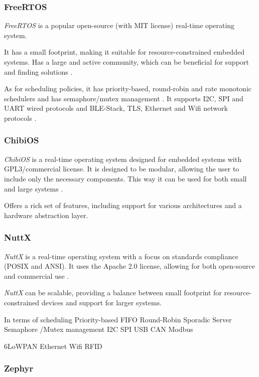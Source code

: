 \subsubsection{FreeRTOS}
\textit{FreeRTOS} is a popular open-source (with MIT license) real-time operating system.

It has a small footprint, making it suitable for resource-constrained embedded systems.
Has a large and active community, which can be beneficial for support and finding solutions \cite{RTOS6}.

As for scheduling policies, it has priority-based, round-robin and rate monotonic schedulers and has semaphore/mutex management \cite{compRTOS}.
It supports I2C, SPI and UART wired protocols and BLE-Stack, TLS, Ethernet and  Wifi network protocols \cite{compRTOS}.
\subsubsection{ChibiOS}

\textit{ChibiOS} is a real-time operating system designed for embedded systems with GPL3/commercial license.
It is designed to be modular, allowing the user to include only the necessary components.
This way it can be used for both small and large systems \cite{chibios}. 

Offers a rich set of features, including support for various architectures and a hardware abstraction layer.

\subsubsection{NuttX}
\cite{nuttx}
\cite{compRTOS}

\textit{NuttX} is a real-time operating system with a focus on standards compliance (POSIX and ANSI).
It uses the Apache 2.0 license, allowing for both open-source and commercial use \cite{nuttx}.

\textit{NuttX} can be scalable, providing a balance between small footprint for resource-constrained devices and support for larger systems.

In terms of scheduling Priority-based 	FIFO Round-Robin Sporadic Server Semaphore /Mutex management
I2C SPI USB CAN Modbus

6LoWPAN Ethernet Wifi RFID

\subsubsection{Zephyr}
\cite{RTOS5}
\cite{zephyr}
\cite{compRTOS}

